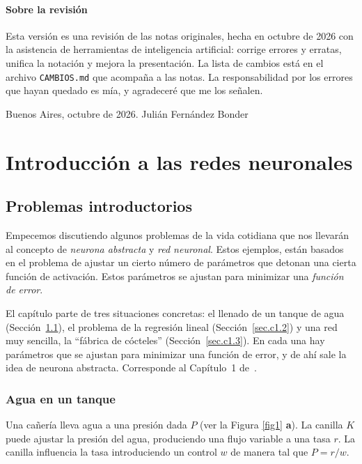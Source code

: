 \documentclass[12pt, a4paper]{amsbook}
\theoremstyle{remark}
\theoremstyle{definition}
\numberwithin{section}{chapter}
\numberwithin{subsection}{section}
\numberwithin{equation}{section}
\numberwithin{figure}{chapter}
\begin{document}
\subsection*{Sobre la revisión}

Esta versión es una revisión de las notas originales, hecha en octubre de 2026
con la asistencia de herramientas de inteligencia artificial: corrige errores
y erratas, unifica la notación y mejora la presentación. La lista de cambios
está en el archivo \texttt{CAMBIOS.md} que acompaña a las notas. La
responsabilidad por los errores que hayan quedado es mía, y agradeceré que me
los señalen.

\bigskip
\noindent Buenos Aires, octubre de 2026.
\hfill Julián Fernández Bonder

\cleardoublepage
\tableofcontents 



\part{Introducción a las redes neuronales}

\chapter{Problemas introductorios}\label{cap1}

Empecemos discutiendo algunos problemas de la vida cotidiana que nos llevarán al concepto de {\em neurona abstracta} y {\em red neuronal}. Estos ejemplos, están basados en el problema de ajustar un cierto número de parámetros que detonan una cierta función de activación. Estos parámetros se ajustan para minimizar una {\em función de error}.

El capítulo parte de tres situaciones concretas: el llenado de un tanque de agua (Sección~\ref{sec.c1.1}), el problema de la regresión lineal (Sección~\ref{sec.c1.2}) y una red muy sencilla, la ``fábrica de cócteles'' (Sección~\ref{sec.c1.3}). En cada una hay parámetros que se ajustan para minimizar una función de error, y de ahí sale la idea de neurona abstracta. Corresponde al Capítulo~1 de~\cite{Calin}.

\section{Agua en un tanque}\label{sec.c1.1}

Una cañería lleva agua a una presión dada $P$ (ver la Figura \ref{fig1} {\bf a}). La canilla $K$ puede ajustar la presión del agua, produciendo una flujo variable a una tasa $r$. La canilla influencia la tasa introduciendo un control $w$ de manera tal que $P=r/w$.
\end{document}
